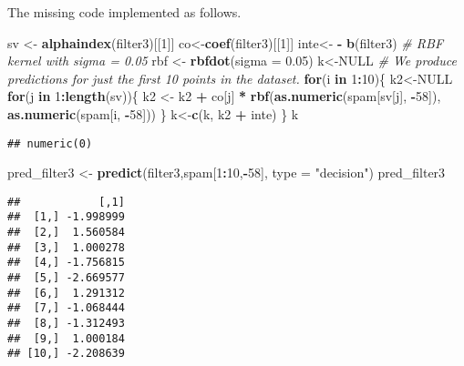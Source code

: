 \documentclass[
]{article}
\newenvironment{Shaded}{\begin{snugshade}}{\end{snugshade}}
\newcommand{\AttributeTok}[1]{\textcolor[rgb]{0.13,0.29,0.53}{#1}}
\newcommand{\CommentTok}[1]{\textcolor[rgb]{0.56,0.35,0.01}{\textit{#1}}}
\newcommand{\ConstantTok}[1]{\textcolor[rgb]{0.56,0.35,0.01}{#1}}
\newcommand{\ControlFlowTok}[1]{\textcolor[rgb]{0.13,0.29,0.53}{\textbf{#1}}}
\newcommand{\DecValTok}[1]{\textcolor[rgb]{0.00,0.00,0.81}{#1}}
\newcommand{\FloatTok}[1]{\textcolor[rgb]{0.00,0.00,0.81}{#1}}
\newcommand{\FunctionTok}[1]{\textcolor[rgb]{0.13,0.29,0.53}{\textbf{#1}}}
\newcommand{\NormalTok}[1]{#1}
\newcommand{\OtherTok}[1]{\textcolor[rgb]{0.56,0.35,0.01}{#1}}
\newcommand{\SpecialCharTok}[1]{\textcolor[rgb]{0.81,0.36,0.00}{\textbf{#1}}}
\newcommand{\StringTok}[1]{\textcolor[rgb]{0.31,0.60,0.02}{#1}}
\begin{document}
The missing code implemented as follows.

\begin{Shaded}
\begin{Highlighting}[]
\NormalTok{sv }\OtherTok{\textless{}{-}} \FunctionTok{alphaindex}\NormalTok{(filter3)[[}\DecValTok{1}\NormalTok{]]}
\NormalTok{co}\OtherTok{\textless{}{-}}\FunctionTok{coef}\NormalTok{(filter3)[[}\DecValTok{1}\NormalTok{]]}
\NormalTok{inte}\OtherTok{\textless{}{-}} \SpecialCharTok{{-}} \FunctionTok{b}\NormalTok{(filter3)}
\CommentTok{\# RBF kernel with sigma = 0.05}
\NormalTok{rbf }\OtherTok{\textless{}{-}} \FunctionTok{rbfdot}\NormalTok{(}\AttributeTok{sigma =} \FloatTok{0.05}\NormalTok{) }
\NormalTok{k}\OtherTok{\textless{}{-}}\ConstantTok{NULL}
\CommentTok{\# We produce predictions for just the first 10 points in the dataset.}
\ControlFlowTok{for}\NormalTok{(i }\ControlFlowTok{in} \DecValTok{1}\SpecialCharTok{:}\DecValTok{10}\NormalTok{)\{ }
\NormalTok{  k2}\OtherTok{\textless{}{-}}\ConstantTok{NULL}
  \ControlFlowTok{for}\NormalTok{(j }\ControlFlowTok{in} \DecValTok{1}\SpecialCharTok{:}\FunctionTok{length}\NormalTok{(sv))\{}
\NormalTok{    k2 }\OtherTok{\textless{}{-}}\NormalTok{ k2 }\SpecialCharTok{+}\NormalTok{ co[j] }\SpecialCharTok{*} \FunctionTok{rbf}\NormalTok{(}\FunctionTok{as.numeric}\NormalTok{(spam[sv[j], }\SpecialCharTok{{-}}\DecValTok{58}\NormalTok{]),}
                           \FunctionTok{as.numeric}\NormalTok{(spam[i, }\SpecialCharTok{{-}}\DecValTok{58}\NormalTok{]))}
\NormalTok{  \}}
\NormalTok{  k}\OtherTok{\textless{}{-}}\FunctionTok{c}\NormalTok{(k,  k2 }\SpecialCharTok{+}\NormalTok{ inte)}
\NormalTok{\}}
\NormalTok{k}
\end{Highlighting}
\end{Shaded}

\begin{verbatim}
## numeric(0)
\end{verbatim}

\begin{Shaded}
\begin{Highlighting}[]
\NormalTok{pred\_filter3 }\OtherTok{\textless{}{-}} \FunctionTok{predict}\NormalTok{(filter3,spam[}\DecValTok{1}\SpecialCharTok{:}\DecValTok{10}\NormalTok{,}\SpecialCharTok{{-}}\DecValTok{58}\NormalTok{], }\AttributeTok{type =} \StringTok{"decision"}\NormalTok{)}
\NormalTok{pred\_filter3}
\end{Highlighting}
\end{Shaded}

\begin{verbatim}
##            [,1]
##  [1,] -1.998999
##  [2,]  1.560584
##  [3,]  1.000278
##  [4,] -1.756815
##  [5,] -2.669577
##  [6,]  1.291312
##  [7,] -1.068444
##  [8,] -1.312493
##  [9,]  1.000184
## [10,] -2.208639
\end{verbatim}
\end{document}
